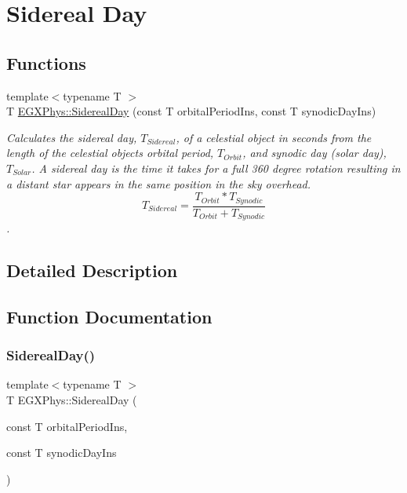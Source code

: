 \hypertarget{group___e_g_x_phys-_astrophysic-_sidereal_day}{}\section{Sidereal Day}
\label{group___e_g_x_phys-_astrophysic-_sidereal_day}
\subsection*{Functions}
\begin{DoxyCompactItemize}
\item 
{\footnotesize template$<$typename T $>$ }\\T \mbox{\hyperlink{group___e_g_x_phys-_astrophysic-_sidereal_day_ga587900d5fc755228c1bb5121cd7965c6}{E\+G\+X\+Phys\+::\+Sidereal\+Day}} (const T orbital\+Period\+Ins, const T synodic\+Day\+Ins)
\begin{DoxyCompactList}\small\item\em Calculates the sidereal day, $T_{Sidereal}$, of a celestial object in seconds from the length of the celestial object\textquotesingle{}s orbital period, $T_{Orbit}$, and synodic day (solar day), $T_{Solar}$. A sidereal day is the time it takes for a full 360 degree rotation resulting in a distant star appears in the same position in the sky overhead. \[ T_{Sidereal}=\dfrac{T_{Orbit} * T_{Synodic}}{T_{Orbit} + T_{Synodic}}\]. \end{DoxyCompactList}\end{DoxyCompactItemize}


\subsection{Detailed Description}


\subsection{Function Documentation}
\mbox{\label{group___e_g_x_phys-_astrophysic-_sidereal_day_ga587900d5fc755228c1bb5121cd7965c6}} 
\subsubsection{\texorpdfstring{Sidereal\+Day()}{SiderealDay()}}
{\footnotesize\ttfamily template$<$typename T $>$ \\
T E\+G\+X\+Phys\+::\+Sidereal\+Day (\begin{DoxyParamCaption}\item[{const T}]{orbital\+Period\+Ins,  }\item[{const T}]{synodic\+Day\+Ins }\end{DoxyParamCaption})}



